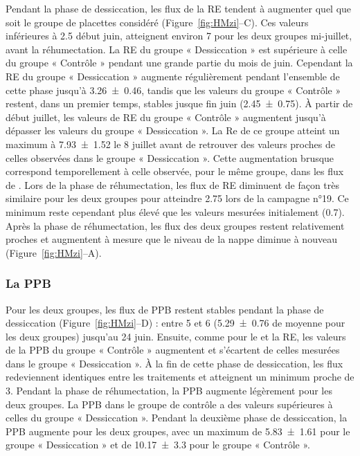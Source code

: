 Pendant la phase de dessiccation, les flux de la RE tendent à augmenter quel que soit le groupe de placettes considéré (Figure~\ref{fig:HMzi}--C).
Ces valeurs inférieures à \SI{2.5}{\uml} début juin, atteignent environ \SI{7}{\uml} pour les deux groupes mi-juillet, avant la réhumectation.
La RE du groupe « Dessiccation » est supérieure à celle du groupe « Contrôle » pendant une grande partie du mois de juin.
Cependant la RE du groupe « Dessiccation » augmente régulièrement pendant l'ensemble de cette phase jusqu'à \SI{3.26(046)}{\uml}, tandis que les valeurs du groupe « Contrôle » restent, dans un premier temps, stables jusque fin juin (\SI{2.45(075)}{\uml}).
À partir de début juillet, les valeurs de RE du groupe « Contrôle » augmentent jusqu'à dépasser les valeurs du groupe « Dessiccation ».
La Re de ce groupe atteint un maximum à \SI{7.93(152)}{\uml} le 8 juillet avant de retrouver des valeurs proches de celles observées dans le groupe « Dessiccation ».
Cette augmentation brusque correspond temporellement à celle observée, pour le même groupe, dans les flux de \chh.
Lors de la phase de réhumectation, les flux de RE diminuent de façon très similaire pour les deux groupes pour atteindre \SI{2.75}{\uml} lors de la campagne n°19.
Ce minimum reste cependant plus élevé que les valeurs mesurées initialement (\SI{0.7}{\uml}).
Après la phase de réhumectation, les flux des deux groupes restent relativement proches et augmentent à mesure que le niveau de la nappe diminue à nouveau (Figure~\ref{fig:HMzi}--A).

\subsubsection{La PPB}

Pour les deux groupes, les flux de PPB restent stables pendant la phase de dessiccation (Figure~\ref{fig:HMzi}--D) :
entre 5 et \SI{6}{\uml} (\SI{5.29(076)}{\uml} de moyenne pour les deux groupes) jusqu'au 24 juin.
Ensuite, comme pour le \chh et la RE, les valeurs de la PPB du groupe « Contrôle » augmentent et s'écartent de celles mesurées dans le groupe « Dessiccation ».
À la fin de cette phase de dessiccation, les flux redeviennent identiques entre les traitements et atteignent un minimum proche de \SI{3}{\uml}.
Pendant la phase de réhumectation, la PPB augmente légèrement pour les deux groupes.
La PPB dans le groupe de contrôle a des valeurs supérieures à celles du groupe « Dessiccation ».
Pendant la deuxième phase de dessiccation, la PPB augmente pour les deux groupes, avec un maximum de \SI{5.83(161)}{\uml} pour le groupe « Dessiccation » et de \SI{10.17(330)}{\uml} pour le groupe « Contrôle ».

